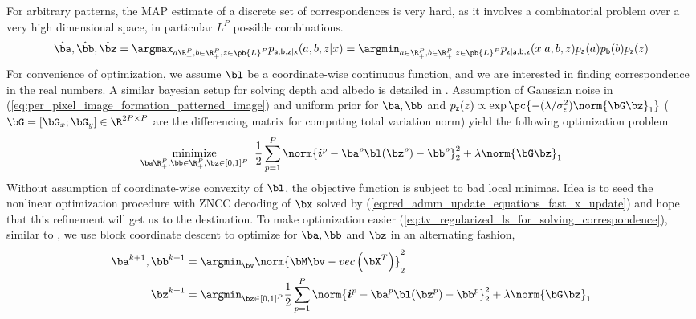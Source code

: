 \documentclass[../writeup.tex]{subfiles}
\begin{document}
For arbitrary patterns, the MAP estimate of a discrete set of correspondences is very hard, as it involves a combinatorial problem over a very high dimensional space, in particular $L^P$ possible combinations.
\begin{align}
    \hat{\ba},\hat{\bb},\hat{\bz}
        = \argmax_{a\R_+^P,b\in\R_+^P,z\in \pb{L}^P} p_{\ra,\rb,\rz|\rx}(a,b,z|x)
        = \argmin_{a\in\R_+^P,b\in\R_+^P,z\in \pb{L}^P} p_{\rz|\ra,\rb,\rz}(x|a,b,z) p_{\ra}(a) p_{\rb}(b) p_{\rz}(z)
    \label{eq:map_inference_of_correspondence_is_hard}
\end{align}
For convenience of optimization, we assume $\bl$ be a coordinate-wise continuous function, and we are interested in finding correspondence in the real numbers. A similar bayesian setup for solving depth and albedo is detailed in \cite{adamBayesianTimeofFlightRealtime2015}. Assumption of Gaussian noise in (\ref{eq:per_pixel_image_formation_patterned_image}) and uniform prior for $\ba,\bb$ and $p_{\rz}(z)\propto \exp\pc{ - (\lambda/\sigma_{\epsilon}^2) \norm{\bG \bz}_1 }$ ($\bG=[\bG_x;\bG_y]\in \R^{2P\times P}$ are the differencing matrix for computing total variation norm) yield the following optimization problem
\begin{align}
    \underset{ \ba\R_+^P,\bb\in\R_+^P,\bz\in [0,1]^P }{\text{minimize}}\;\;
        \frac{1}{2} \sum_{ p=1 }^P \norm{ \si^p - \ba^p \bl(\bz^p) - \bb^p }_2^2 + \lambda \norm{\bG \bz}_1
    \label{eq:tv_regularized_ls_for_solving_correspondence}
\end{align}
Without assumption of coordinate-wise convexity of $\bl$, the objective function is subject to bad local minimas. Idea is to seed the nonlinear optimization procedure with ZNCC decoding of $\bx$ solved by (\ref{eq:red_admm_update_equations_fast_x_update}) and hope that this refinement will get us to the destination. To make optimization easier (\ref{eq:tv_regularized_ls_for_solving_correspondence}), similar to \cite{rosmanSparseModelingShape2012}, we use block coordinate descent to optimize for $\ba,\bb$ and $\bz$ in an alternating fashion,
\begin{align}
    \ba^{k+1},\bb^{k+1}
        &= \argmin_{\bv} \norm{ \bM\bv - \vec{\bX^T} }_2^2 
    \label{eq:tv_regularized_ls_for_solving_correspondence_altmin_1} \\
    \bz^{k+1}
        &= \argmin_{\bz\in[0,1]^P} \frac{1}{2} \sum_{ p=1 }^P \norm{ \si^p - \ba^p \bl(\bz^p) - \bb^p }_2^2 + \lambda \norm{\bG \bz}_1 
    \label{eq:tv_regularized_ls_for_solving_correspondence_altmin_2}
\end{align}
\end{document}
